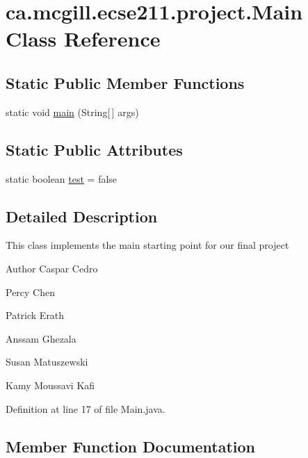\hypertarget{classca_1_1mcgill_1_1ecse211_1_1project_1_1_main}{}\section{ca.\+mcgill.\+ecse211.\+project.\+Main Class Reference}
\label{classca_1_1mcgill_1_1ecse211_1_1project_1_1_main}
\subsection*{Static Public Member Functions}
\begin{DoxyCompactItemize}
\item 
static void \hyperlink{classca_1_1mcgill_1_1ecse211_1_1project_1_1_main_af681b5dc675c13ed284071cc135f5fd3}{main} (String\mbox{[}$\,$\mbox{]} args)
\end{DoxyCompactItemize}
\subsection*{Static Public Attributes}
\begin{DoxyCompactItemize}
\item 
static boolean \hyperlink{classca_1_1mcgill_1_1ecse211_1_1project_1_1_main_af6f7b8fffddcf855f74fe128d2e23ea1}{test} = false
\end{DoxyCompactItemize}


\subsection{Detailed Description}
This class implements the main starting point for our final project

\begin{DoxyAuthor}{Author}
Caspar Cedro 

Percy Chen 

Patrick Erath 

Anssam Ghezala 

Susan Matuszewski 

Kamy Moussavi Kafi 
\end{DoxyAuthor}


Definition at line 17 of file Main.\+java.



\subsection{Member Function Documentation}
\mbox{\label{classca_1_1mcgill_1_1ecse211_1_1project_1_1_main_af681b5dc675c13ed284071cc135f5fd3}} 
